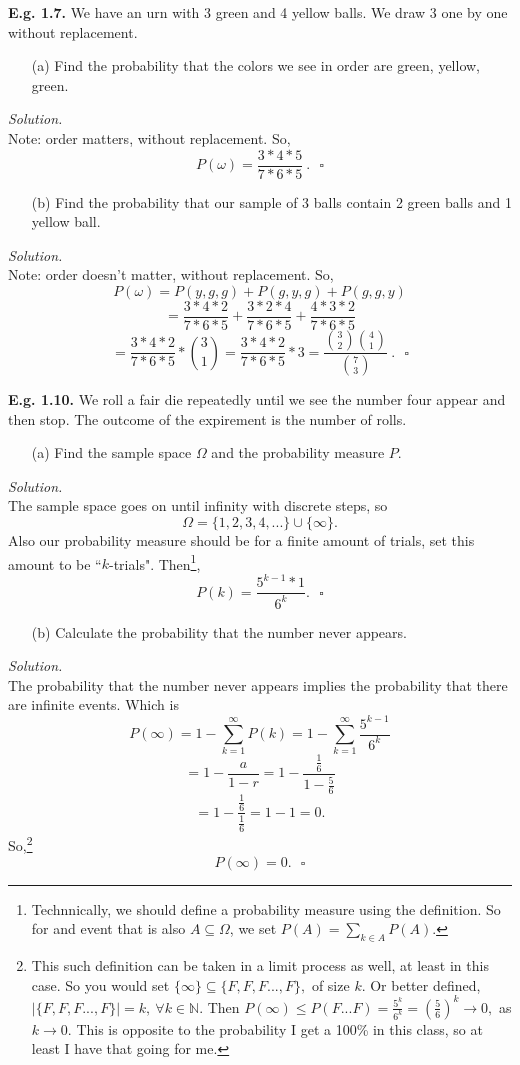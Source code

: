 \documentclass[12pt]{book}
\begin{document}
\noindent \textbf{E.g. 1.7. } We have an urn with 3 green and 4 yellow balls. We draw 3 one by one without replacement.
\begin{itemize}\item [(a)] Find the probability that the colors we see in order are green, yellow, green.\end{itemize}
\textit{Solution. } \\
Note: order matters, without replacement. So,
$$P(\omega) = \frac{3*4*5}{7*6*5}~.~~~\square$$
\begin{itemize}\item [(b)] Find the probability that our sample of 3 balls contain 2 green balls and 1 yellow ball.\end{itemize}
\textit{Solution. } \\
Note: order doesn't matter, without replacement. So,
$$P(\omega) = P (y,g,g) + P (g,y,g) + P(g,g,y)$$
$$=\frac{3*4*2}{7*6*5} + \frac{3*2*4}{7*6*5} + \frac{4*3*2}{7*6*5}$$
$$=\frac{3*4*2}{7*6*5} * {3 \choose 1} = \frac{3*4*2}{7*6*5} * 3 = \dfrac{{3\choose 2}{4\choose 1}}{{7\choose3}}~.~~~\square$$

\noindent \textbf{E.g. 1.10. } We roll a fair die repeatedly until we see the number four appear and then stop. The outcome of the expirement is the number of rolls.
\begin{itemize}\item [(a)] Find the sample space $\Omega$ and the probability measure $P$. \end{itemize}
\textit{Solution. } \\
The sample space goes on until infinity with discrete steps, so
$$ \Omega = \big\{ 1,2,3,4,... \big\} \cup \big\{ \infty \big\}.$$
Also our probability measure should be for a finite amount of trials, set this amount to be ``$k$-trials". Then\footnote{Technnically, we should define a probability measure using the definition. So for and event that is also $A\subseteq \Omega$, we set $P(A)=\sum\limits_{k\in A} P(A)$.},
$$ P(k) = \frac{5^{k-1}*1}{6^k}.~~~\square$$
\begin{itemize}\item [(b)] Calculate the probability that the number never appears.\end{itemize}
\textit{Solution. } \\
The probability that the number never appears implies the probability that there are infinite events.
Which is
$$P(\infty)=1-\sum\limits_{k=1}^{\infty} P(k) = 1- \sum\limits_{k=1}^{\infty} \frac{5^{k-1}}{6^k}$$
$$ = 1-\frac{a}{1-r} = 1-\frac{\frac{1}{6}}{1-\frac{5}{6}}$$
$$ = 1-\frac{\frac{1}{6}}{\frac{1}{6}} = 1-1 = 0.$$
So,\footnote{This such definition can be taken in a limit process as well, at least in this case. So you would set $\{\infty \} \subseteq \{F,F,F...,F\},$ of size $k$. Or better defined, $|\{F,F,F...,F\}|=k,~\forall k\in \mathbb{N}$. Then $P(\infty) \leq P(F...F) = \frac{5^k}{6^k} = \left( \frac{5}{6} \right)^k \rightarrow 0,$ as $k\rightarrow 0$. This is opposite to the probability I get a 100\% in this class, so at least I have that going for me.}
$$P(\infty) = 0.~~~\square$$
\end{document}
